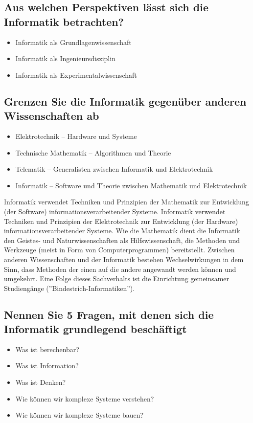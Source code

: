 \subsection{Aus welchen Perspektiven lässt sich die Informatik betrachten?}

\begin{itemize}
  \item Informatik als Grundlagenwissenschaft
  \item Informatik als Ingenieursdisziplin
  \item Informatik als Experimentalwissenschaft
\end{itemize}

\subsection{Grenzen Sie die Informatik gegenüber anderen Wissenschaften ab}

\begin{itemize}
  \item Elektrotechnik -- Hardware und Systeme
  \item Technische Mathematik -- Algorithmen und Theorie
  \item Telematik -- Generalisten zwischen Informatik und Elektrotechnik
  \item Informatik -- Software und Theorie zwischen Mathematik und
    Elektrotechnik
\end{itemize}

Informatik verwendet Techniken und Prinzipien der Mathematik zur
Entwicklung (der Software) informationsverarbeitender Systeme. Informatik
verwendet Techniken und Prinzipien der Elektrotechnik zur Entwicklung
(der Hardware) informationsverarbeitender Systeme. Wie die Mathematik
dient die Informatik den Geistes- und Naturwissenschaften als
Hilfswissenschaft, die Methoden und Werkzeuge (meist in Form von
Computerprogrammen) bereitstellt. Zwischen anderen Wissenschaften und der
Informatik bestehen Wechselwirkungen in dem Sinn, dass Methoden der einen
auf die andere angewandt werden können und umgekehrt. Eine Folge dieses
Sachverhalts ist die Einrichtung gemeinsamer Studiengänge
(''Bindestrich-Informatiken'').

\subsection{Nennen Sie 5 Fragen, mit denen sich die Informatik grundlegend
    beschäftigt}

\begin{itemize}
  \item Was ist berechenbar?
  \item Was ist Information?
  \item Was ist Denken?
  \item Wie können wir komplexe Systeme verstehen?
  \item Wie können wir komplexe Systeme bauen?
\end{itemize}

